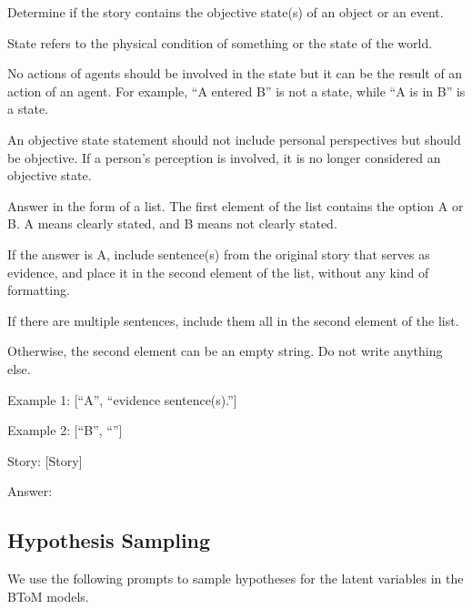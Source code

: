 \begin{tcolorbox}[
    breakable,
    colframe=green!40!black,
    colback=green!5,
    coltitle=white,
    fonttitle=\bfseries,
    title=Extracting states,
    colbacktitle=green!40!black
]
Determine if the story contains the objective state(s) of an object or an event.

State refers to the physical condition of something or the state of the world.

No actions of agents should be involved in the state but it can be the result of an action of an agent. For example, ``A entered B'' is not a state, while ``A is in B'' is a state.

An objective state statement should not include personal perspectives but should be objective. If a person's perception is involved, it is no longer considered an objective state.

Answer in the form of a list. The first element of the list contains the option A or B. A means clearly stated, and B means not clearly stated.

If the answer is A, include sentence(s) from the original story that serves as evidence, and place it in the second element of the list, without any kind of formatting.

If there are multiple sentences, include them all in the second element of the list.

Otherwise, the second element can be an empty string. Do not write anything else.

Example 1: [``A'', ``evidence sentence(s).'']

Example 2: [``B'', ``''] \newline

Story: [Story]

Answer:
\end{tcolorbox}



\subsection{Hypothesis Sampling}
We use the following prompts to sample hypotheses for the latent variables in the BToM models. 

